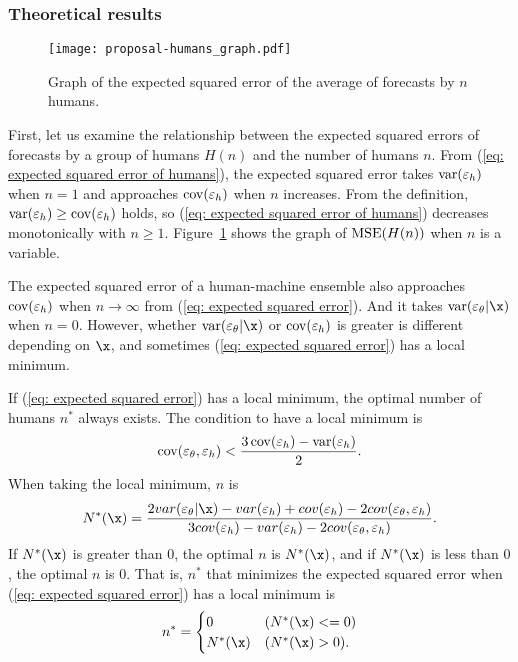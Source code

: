 \documentclass[../main.tex]{subfiles}
\begin{document}
\subsubsection{Theoretical results}
\label{ssub: Theroretical results}

\begin{figure}
  \centering
  \texttt{[image: proposal-humans\_graph.pdf]}
  \caption{
    Graph of the expected squared error of the average of forecasts by $n$ humans.
  }\label{fig: graph of humans only}
\end{figure}

First, let us examine the relationship between the expected squared errors of forecasts by a group of humans $H(n)$ and the number of humans $n$.
From (\ref{eq: expected squared error of humans}), the expected squared error takes $\operatorname{var}(\varepsilon_h)$ when $n = 1$ and approaches $\operatorname{cov}(\varepsilon_h)$ when $n$ increases.
From the definition, $\operatorname{var}(\varepsilon_h) \geq \operatorname{cov}(\varepsilon_h)$ holds, so (\ref{eq: expected squared error of humans}) decreases monotonically with $n \geq 1$.
Figure~\ref{fig: graph of humans only} shows the graph of $\operatorname{MSE}(H(n))$ when $n$ is a variable.

The expected squared error of a human-machine ensemble also approaches $\operatorname{cov}(\varepsilon_h)$ when $n \to \infty$ from (\ref{eq: expected squared error}).
And it takes $\varm$ when $n = 0$.
However, whether $\varm$ or $\operatorname{cov}(\varepsilon_h)$ is greater is different depending on $\x$, and sometimes (\ref{eq: expected squared error}) has a local minimum.

If (\ref{eq: expected squared error}) has a local minimum, the optimal number of humans $n^\ast$ always exists.
The condition to have a local minimum is
\begin{equation}
  \operatorname{cov}(\varepsilon_\theta, \varepsilon_h) < \frac{3\operatorname{cov}(\varepsilon_h) - \operatorname{var}(\varepsilon_h)}{2}.
  \label{eq: condition}
\end{equation}
When taking the local minimum, $n$ is
\begin{equation}
  N^\ast(\x)
    = \frac
        {2var(\varepsilon_\theta|\x) - var(\varepsilon_h) + cov(\varepsilon_h) - 2cov(\varepsilon_\theta,\varepsilon_h)}
        {3 cov(\varepsilon_h) - var(\varepsilon_h) - 2 cov(\varepsilon_\theta,\varepsilon_h)}.
\end{equation}
If $N^\ast(\x)$ is greater than $0$, the optimal $n$ is $N^\ast(\x)$, and if $N^\ast(\x)$ is less than $0$, the optimal $n$ is $0$.
That is, $n^\ast$ that minimizes the expected squared error when (\ref{eq: expected squared error}) has a local minimum is
\begin{equation}
  n^\ast =
    \begin{cases}
      0 & (N^\ast(\x) <= 0) \\
      N^\ast(\x) & (N^\ast(\x) > 0).
    \end{cases}
\end{equation}
\end{document}
